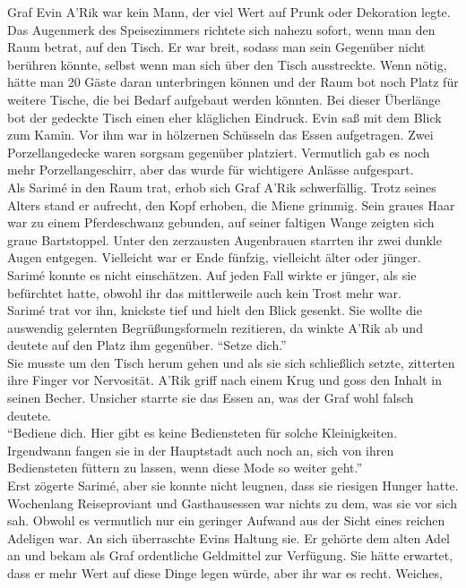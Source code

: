 Graf Evin A'Rik war kein Mann, der viel Wert auf Prunk oder Dekoration legte. Das Augenmerk des 
Speisezimmers richtete sich nahezu sofort, wenn man den Raum betrat, auf den Tisch. Er war breit, 
sodass man sein Gegenüber nicht berühren könnte, selbst wenn man sich über den Tisch ausstreckte. 
Wenn nötig, hätte man 20 Gäste daran unterbringen können und der Raum bot noch Platz für weitere 
Tische, die bei Bedarf aufgebaut werden könnten. Bei dieser Überlänge bot der gedeckte Tisch einen 
eher kläglichen Eindruck. Evin saß mit dem Blick zum Kamin. Vor ihm war in hölzernen Schüsseln das 
Essen aufgetragen. Zwei Porzellangedecke waren sorgsam gegenüber platziert. Vermutlich gab es noch 
mehr Porzellangeschirr, aber das wurde für wichtigere Anlässe aufgespart. \\
Als Sarimé in den Raum trat, erhob sich Graf A'Rik schwerfällig. Trotz seines Alters stand er 
aufrecht, den Kopf erhoben, die Miene grimmig. Sein graues Haar war zu einem Pferdeschwanz 
gebunden, auf seiner faltigen Wange zeigten sich graue Bartstoppel. Unter den zerzausten 
Augenbrauen starrten ihr zwei dunkle Augen entgegen. Vielleicht war er Ende fünfzig, vielleicht 
älter oder jünger. Sarimé konnte es nicht einschätzen. Auf jeden Fall wirkte er jünger, als sie 
befürchtet hatte, obwohl ihr das mittlerweile auch kein Trost mehr war.\\
Sarimé trat vor ihn, knickste tief und hielt den Blick gesenkt. Sie wollte die auswendig gelernten 
Begrüßungsformeln rezitieren, da winkte A'Rik ab und deutete auf den Platz ihm gegenüber. ``Setze 
dich.''\\
Sie musste um den Tisch herum gehen und als sie sich schließlich setzte, zitterten ihre Finger vor 
Nervosität. A'Rik griff nach einem Krug und goss den Inhalt in seinen Becher. Unsicher starrte sie 
das Essen an, was der Graf wohl falsch deutete.\\
``Bediene dich. Hier gibt es keine Bediensteten für solche Kleinigkeiten. Irgendwann fangen sie in 
der Hauptstadt auch noch an, sich von ihren Bediensteten füttern zu lassen, wenn diese Mode so 
weiter geht.''\\
Erst zögerte Sarimé, aber sie konnte nicht leugnen, dass sie riesigen Hunger hatte. Wochenlang 
Reiseproviant und Gasthausessen war nichts zu dem, was sie vor sich sah. Obwohl es vermutlich nur 
ein geringer Aufwand aus der Sicht eines reichen Adeligen war. An sich überraschte Evins Haltung 
sie. Er gehörte dem alten Adel an und bekam als Graf ordentliche Geldmittel zur Verfügung. Sie 
hätte erwartet, dass er mehr Wert auf diese Dinge legen würde, aber ihr war es recht. Weiches, 
